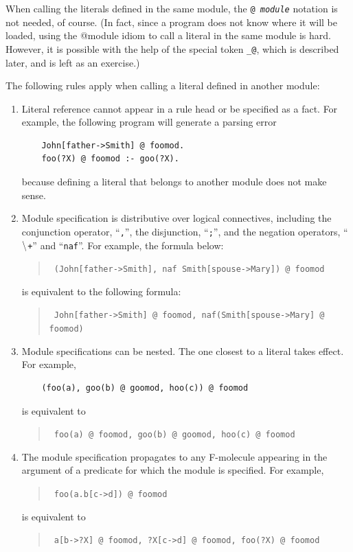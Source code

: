 \documentclass[11pt]{article}
\makeatletter
\newcommand{\thismodule}{{\tt \_@}\xspace}
\newcommand{\PLGNAF}{\mbox{\tt \ensuremath{\tt\backslash}+}\xspace}
\newcommand{\SILKNAF}{{{\tt naf}}\xspace}
\makeatother
\begin{document}
When calling the literals defined in the same module, the {\tt @{\it
    module}} notation is not needed, of course. (In fact, since a program
does not know where it will be loaded, using the @module idiom to call a
literal in the same module is hard. However, it is possible with the help
of the special token \thismodule, which is described later, and is left
as an exercise.)

The following rules apply when calling a literal defined in another module:
\begin{enumerate}
\item Literal reference cannot appear in a rule head or be specified as
  a fact. For example, the following program will generate
  a parsing error
  \begin{verbatim}
    John[father->Smith] @ foomod.
    foo(?X) @ foomod :- goo(?X).
  \end{verbatim}
  because defining a literal that belongs to another module does not make
  sense.
  
\item Module specification is distributive over logical connectives,
  including the conjunction operator, ``\verb|,|'', the disjunction,
  ``\verb|;|'', and the negation operators, ``\PLGNAF'' and
  ``\SILKNAF''. For example, the formula below:
  \begin{quote}
    {\tt
    (John[father->Smith], \SILKNAF Smith[spouse->Mary]) @ foomod
    }
  \end{quote}
  is equivalent to the following formula:
  \begin{quote}
    {\tt
    John[father->Smith] @ foomod, \SILKNAF (Smith[spouse->Mary] @ foomod)
    }
  \end{quote}

\item Module specifications can be nested. The one closest to a literal
  takes effect. For example,
  \begin{verbatim}
    (foo(a), goo(b) @ goomod, hoo(c)) @ foomod
  \end{verbatim}
  is equivalent to
  \begin{quote}
    {\tt
      foo(a) @ foomod, goo(b) @ goomod, hoo(c) @ foomod
    }
  \end{quote}
  
\item The module specification propagates to any F-molecule appearing
  in the argument of a predicate for which the module is
  specified. For example,
  \begin{quote}
    {\tt
    foo(a.b[c->d]) @ foomod
    }
  \end{quote}
  is equivalent to
  \begin{quote}
    {\tt
    a[b->?X] @ foomod, ?X[c->d] @ foomod, foo(?X) @ foomod
    }
  \end{quote}
  

\end{enumerate}
\end{document}
